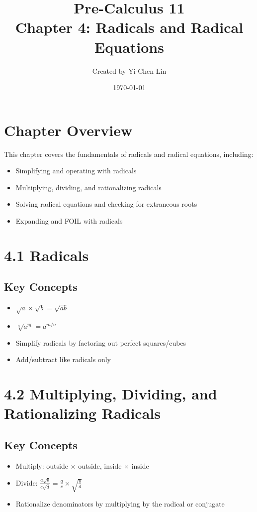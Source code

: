 \documentclass[12pt]{article}
\title{Pre-Calculus 11 \\ Chapter 4: Radicals and Radical Equations}
\author{Created by Yi-Chen Lin}
\date{\today}
\begin{document}
\maketitle

\section*{Chapter Overview}
This chapter covers the fundamentals of radicals and radical equations, including:
\begin{itemize}
    \item Simplifying and operating with radicals
    \item Multiplying, dividing, and rationalizing radicals
    \item Solving radical equations and checking for extraneous roots
    \item Expanding and FOIL with radicals
\end{itemize}

\section{4.1 Radicals}
\subsection*{Key Concepts}
\begin{tcolorbox}[colback=lightgray,colframe=primary,title=Radical Properties]
    \begin{itemize}
        \item $\sqrt{a} \times \sqrt{b} = \sqrt{ab}$
        \item $\sqrt[n]{a^m} = a^{m/n}$
        \item Simplify radicals by factoring out perfect squares/cubes
        \item Add/subtract like radicals only
    \end{itemize}
\end{tcolorbox}

\section{4.2 Multiplying, Dividing, and Rationalizing Radicals}
\subsection*{Key Concepts}
\begin{tcolorbox}[colback=lightgray,colframe=primary,title=Operations with Radicals]
    \begin{itemize}
        \item Multiply: outside $\times$ outside, inside $\times$ inside
        \item Divide: $\frac{a\sqrt{b}}{c\sqrt{d}} = \frac{a}{c} \times \sqrt{\frac{b}{d}}$
        \item Rationalize denominators by multiplying by the radical or conjugate
    \end{itemize}
\end{tcolorbox}
\end{document}
